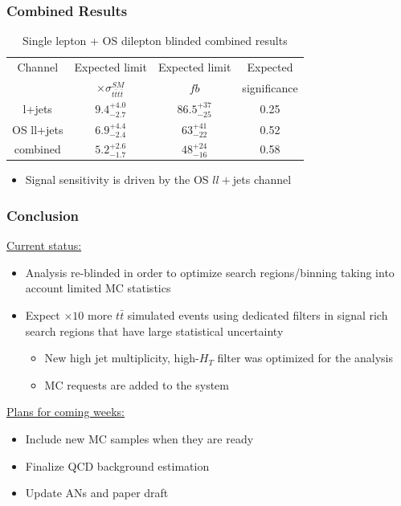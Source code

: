 \documentclass{beamer}
\begin{document}

\begin{frame}
\frametitle{Combined Results}

\begin{table}
\caption{Single lepton + OS dilepton blinded combined results}
\vspace{0pt} 
\begin{tabular}{| c | c | c | c |}
\hline
Channel	&Expected limit	&Expected limit	&Expected \\
 & $\times \sigma_{t\bar{t}t\bar{t}}^{SM}$ &  $fb$ &significance \\
\hline
l+jets	& $9.4^{+4.0}_{-2.7}$ & $86.5^{+37}_{-25}$ & 0.25 \\
\hline
OS ll+jets		&$6.9_{-2.4}^{+4.4}$ &$63_{-22}^{+41}$ & 0.52  \\
\hline
combined &$5.2_{-1.7}^{+2.6}$ &$48_{-16}^{+24}$ & 0.58 \\
\hline
\end{tabular} 
\end{table}
\begin{itemize}
\item Signal sensitivity is driven by the OS $ll+$jets channel
\end{itemize}
\end{frame}


\begin{frame}
\frametitle{Conclusion}
\underline{Current status:}
\begin{itemize}
\item Analysis re-blinded in order to optimize search regions/binning taking into account limited MC statistics
\item Expect $\times 10$ more $t\bar{t}$ simulated events using dedicated filters in signal rich search regions that have large statistical uncertainty
\begin{itemize}
\item New high jet multiplicity, high-$H_T$ filter was optimized for the analysis
\item MC requests are added to the system
\end{itemize}
\end{itemize}
\underline{Plans for coming weeks:}
\begin{itemize}
\item Include new MC samples when they are ready
\item Finalize QCD background estimation
\item Update ANs and paper draft 
\end{itemize}
\end{frame}
\end{document}
